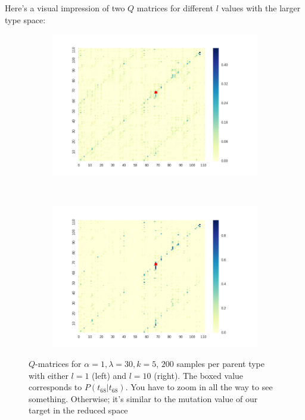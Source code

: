 \documentclass[a4paper]{article}
\begin{document}
Here's a visual impression of two $Q$ matrices for different $l$ values with the larger type space:

\begin{figure}[h!]
  \centering
  \begin{subfigure}[b]{0.45\textwidth}
    \includegraphics[scale=0.4]{../code-LOT-extension/plots/q-l30-a1-k5-l1-meFalse.png}
  \end{subfigure}
  ~
   \begin{subfigure}[b]{0.45\textwidth}
    \includegraphics[scale=0.4]{../code-LOT-extension/plots/q-l30-a1-k5-l10-meFalse.png}
  \end{subfigure}
  \caption{$Q$-matrices for $\alpha = 1, \lambda = 30, k = 5$, $200$ samples per parent type with either $l = 1$ (left) and $l = 10$ (right). The boxed value corresponds to $P(t_{68} | t_{68})$. You have to zoom in all the way to see something. Otherwise; it's similar to the mutation value of our target in the reduced space}
  \label{fig:q-matrices}
\end{figure}
\end{document}

